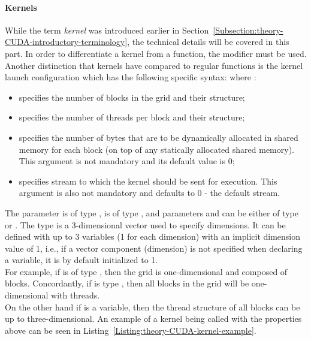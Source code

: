 \paragraph{Kernels}\label{Paragraph:theory-CUDA-c++-CUDA-extensions-kernels}
While the term \textit{kernel} was introduced earlier in Section~\ref{Subsection:theory-CUDA-introductory-terminology}, the technical details will be covered in this part. In order to differentiate a kernel from a function, the  modifier must be used. Another distinction that kernels have compared to regular functions is the kernel launch configuration which has the following specific syntax:   where \cite{NVIDIAMay2022, Cejka2020}:

\begin{itemize}
	\item {} specifies the number of blocks in the grid and their structure;
	\item {} specifies the number of threads per block and their structure;
	\item {} specifies the number of bytes that are to be dynamically allocated in shared memory for each block (on top of any statically allocated shared memory). This argument is not mandatory and its default value is 0;
	\item {} specifies stream to which the kernel should be sent for execution. This argument is also not mandatory and defaults to 0 - the default stream.
\end{itemize}

The  parameter is of type ,  is of type , and parameters  and  can be either of type  or . The  type is a 3-dimensional  vector used to specify dimensions. It can be defined with up to 3 variables (1 for each dimension) with an implicit dimension value of 1, i.e., if a vector component (dimension) is not specified when declaring a  variable, it is by default initialized to 1. \\
For example, if  is of type , then the grid is one-dimensional and composed of  blocks. Concordantly, if  is type , then all blocks in the grid will be one-dimensional with  threads. \\
On the other hand if  is a  variable, then the thread structure of all blocks can be up to three-dimensional. An example of a kernel being called with the properties above can be seen in Listing~\ref{Listing:theory-CUDA-kernel-example}.

